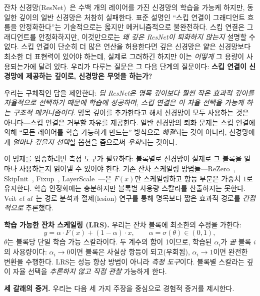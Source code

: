 \documentclass{bmvc2k}
\def\etal{\emph{et al}\bmvaOneDot}
\begin{document}
잔차 신경망(ResNet)~\cite{he2016deep}은 수백 개의 레이어를 가진 신경망의 학습을 가능케 하지만, 동일한 깊이의 일반 신경망은 처참히 실패한다. 표준 설명인 ``스킵 연결이 그래디언트 흐름을 안정화한다''는 기술적으로는 옳지만 메커니즘적으로 불완전하다. 스킵 연결은 그래디언트를 안정화하지만, 이것만으로는 \emph{왜 깊은 ResNet이 퇴화하지 않는지} 설명할 수 없다. 스킵 연결이 단순히 더 많은 연산을 허용한다면 깊은 신경망은 얕은 신경망보다 최소한 더 표현력이 있어야 하는데, 실제로 그러하긴 하지만 이는 \emph{어떻게} 그 용량이 사용되는가에 달려 있다. 우리가 다루는 질문은 그 다음 단계의 질문이다: \textbf{스킵 연결이 신경망에 제공하는 깊이로, 신경망은 무엇을 하는가?}

우리는 구체적인 답을 제안한다: \emph{딥 ResNet은 명목 깊이보다 훨씬 작은 효과적 깊이를 자율적으로 선택하기 때문에 학습에 성공하며, 스킵 연결은 이 자율 선택을 가능케 하는 구조적 메커니즘이다.} 명목 깊이를 추가한다고 해서 신경망이 모두 사용하는 것은 아니다---스킵 연결은 거부할 자유를 제공한다. 일반 신경망의 퇴화 문제는 스킵 연결에 의해 ``모든 레이어를 학습 가능하게 만드는'' 방식으로 \emph{해결}되는 것이 아니라, 신경망에게 \emph{얼마나 깊을지 선택}할 옵션을 줌으로써 \emph{우회}되는 것이다.

이 명제를 입증하려면 측정 도구가 필요하다: 블록별로 신경망이 실제로 그 블록을 얼마나 사용하는지 읽어낼 수 있어야 한다. 기존 잔차 스케일링 방법들---ReZero~\cite{bachlechner2021rezero}, SkipInit~\cite{de2020batch}, Fixup~\cite{zhang2019fixup}, LayerScale~\cite{touvron2021going}---은 $F(x)$만 스케일링하고 항등 부분은 가중치 $1$로 유지한다. 학습 안정화에는 충분하지만 블록별 사용량 스칼라를 산출하지는 못한다. Veit \etal~\cite{veit2016residual}는 경로 분석과 절제(lesion) 연구를 통해 명목보다 짧은 효과적 경로를 \emph{간접적으로} 추론했다.

\textbf{학습 가능한 잔차 스케일링 (LRS).} 우리는 잔차 블록에 최소한의 수정을 가한다:
\begin{equation}
y = \alpha \cdot F(x) + (1-\alpha) \cdot x, \qquad \alpha = \sigma(\theta) \in (0,1),
\label{eq:lrs}
\end{equation}
$\theta$는 블록당 단일 학습 가능 스칼라이다. 두 계수의 합이 1이므로, 학습된 $\alpha_i$가 \emph{곧} 블록 $i$의 사용량이다: $\alpha_i \to 0$이면 블록은 사실상 항등이 되고(우회됨), $\alpha_i \to 1$이면 완전한 변환을 수행한다. LRS는 성능 향상 방법이 아니라 \emph{측정 도구}이다. 블록별 스칼라는 깊이 자율 선택을 \emph{추론하지 않고 직접 관찰} 가능하게 한다.

\textbf{세 갈래의 증거.} 우리는 다음 세 가지 주장을 중심으로 경험적 증거를 제시한다.
\end{document}
